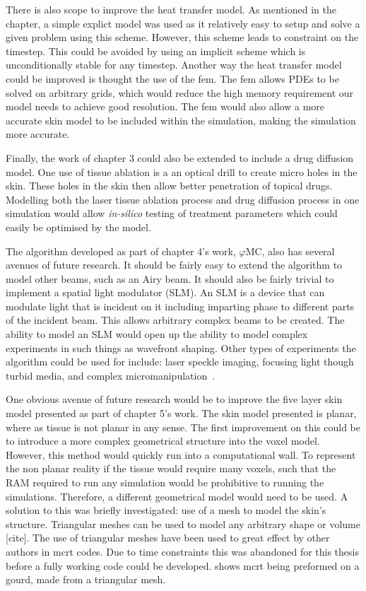 There is also scope to improve the heat transfer model.
As mentioned in the chapter, a simple explict model was used as it relatively easy to setup and solve a given problem using this scheme.
However, this scheme leads to constraint on the timestep.
This could be avoided by using an implicit scheme which is unconditionally stable for any timestep.
Another way the heat transfer model could be improved is thought the use of the \gls*{fem}.
The \gls*{fem} allows PDEs to be solved on arbitrary grids, which would reduce the high memory requirement our model needs to achieve good resolution.
The \gls*{fem} would also allow a more accurate skin model to be included within the simulation, making the simulation more accurate.

Finally, the work of chapter 3 could also be extended to include a drug diffusion model.
One use of tissue ablation is a an optical drill to create micro holes in the skin. 
These holes in the skin then allow better penetration of topical drugs.
Modelling both the laser tissue ablation process and drug diffusion process in one simulation would allow \textit{in-silico} testing of treatment parameters which could easily be optimised by the model.

\medskip

The algorithm developed as part of chapter 4's work, $\varphi$MC, also has several avenues of future research.
It should be fairly easy to extend the algorithm to model other beams, such as an Airy beam.
It should also be fairly trivial to implement a spatial light modulator (SLM).
An SLM is a device that can modulate light that is incident on it including imparting phase to different parts of the incident beam.
This allows arbitrary complex beams to be created.
The ability to model an SLM would open up the ability to model complex experiments in such things as wavefront shaping.
Other types of experiments the algorithm could be used for include: laser speckle imaging, focusing light though turbid media, and complex micromanipulation~\cite{vellekoop2007focusing,horstmeyer2015guidestar,vcivzmar2010situ}.

\medskip

One obvious avenue of future research would be to improve the five layer skin model presented as part of chapter 5's work.
The skin model presented is planar, where as tissue is not planar in any sense.
The first improvement on this could be to introduce a more complex geometrical structure into the voxel model.
However, this method would quickly run into a computational wall.
To represent the non planar reality if the tissue would require many voxels, such that the RAM required to run any simulation would be prohibitive to running the simulations.
Therefore, a different geometrical model would need to be used.
A solution to this was briefly investigated: use of a mesh to model the skin's structure.
Triangular meshes can be used to model any arbitrary shape or volume [cite].
The use of triangular meshes have been used to great effect by other authors in \gls*{mcrt} codes.
Due to time constraints this was abandoned for this thesis before a fully working code could be developed.
 shows \gls*{mcrt} being preformed on a gourd, made from a triangular mesh.

